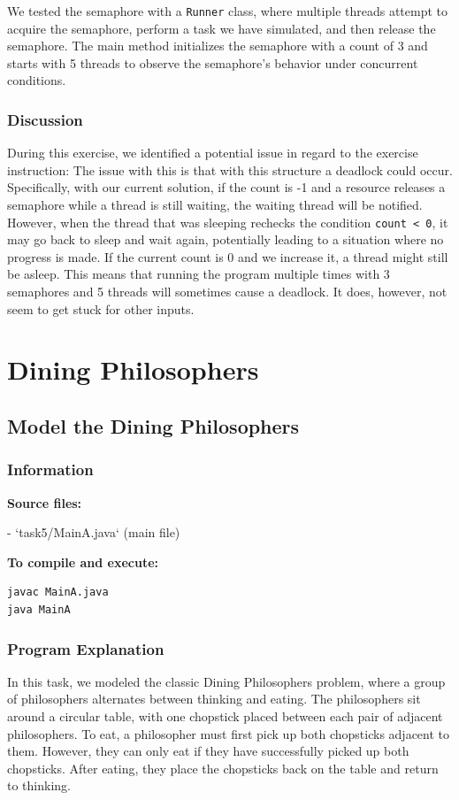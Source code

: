 \documentclass{article}
\begin{document}
We tested the semaphore with a \texttt{Runner} class, where multiple threads attempt to acquire the semaphore, perform a task we have simulated, and then release the semaphore. The main method initializes the semaphore with a count of 3 and starts with 5 threads to observe the semaphore's behavior under concurrent conditions.

\subsubsection{Discussion}
During this exercise, we identified a potential issue in regard to the exercise instruction:  The issue with this is that with this structure a deadlock could occur. Specifically, with our current solution, if the count is -1 and a resource releases a semaphore while a thread is still waiting, the waiting thread will be notified. However, when the thread that was sleeping rechecks the condition \texttt{count < 0}, it may go back to sleep and wait again, potentially leading to a situation where no progress is made. If the current count is 0 and we increase it, a thread might still be asleep. This means that running the program multiple times with 3 semaphores and 5 threads will sometimes cause a deadlock. It does, however, not seem to get stuck for other inputs.


\newpage
\section{Dining Philosophers}
\subsection{Model the Dining Philosophers}

\subsubsection{Information}
\textbf{Source files:}

- `task5/MainA.java` (main file)

\textbf{To compile and execute:}
\begin{lstlisting}[style=bash]
javac MainA.java
java MainA
\end{lstlisting}

\subsubsection{Program Explanation}
In this task, we modeled the classic Dining Philosophers problem, where a group of philosophers alternates between thinking and eating. The philosophers sit around a circular table, with one chopstick placed between each pair of adjacent philosophers. To eat, a philosopher must first pick up both chopsticks adjacent to them. However, they can only eat if they have successfully picked up both chopsticks. After eating, they place the chopsticks back on the table and return to thinking.
\end{document}
